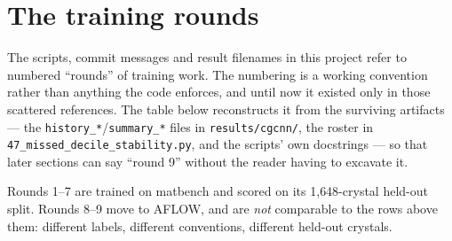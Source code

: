 \documentclass[11pt,a4paper]{article}
\begin{document}
\section{The training rounds}

The scripts, commit messages and result filenames in this project refer to
numbered ``rounds'' of training work. The numbering is a working convention
rather than anything the code enforces, and until now it existed only in those
scattered references. The table below reconstructs it from the surviving
artifacts --- the \texttt{history\_*}/\texttt{summary\_*} files in
\texttt{results/cgcnn/}, the roster in
\texttt{47\_missed\_decile\_stability.py}, and the scripts' own docstrings ---
so that later sections can say ``round 9'' without the reader having to
excavate it.

Rounds 1--7 are trained on matbench and scored on its 1{,}648-crystal held-out
split. Rounds 8--9 move to AFLOW, and are \emph{not} comparable to the rows
above them: different labels, different conventions, different held-out
crystals.
\end{document}
